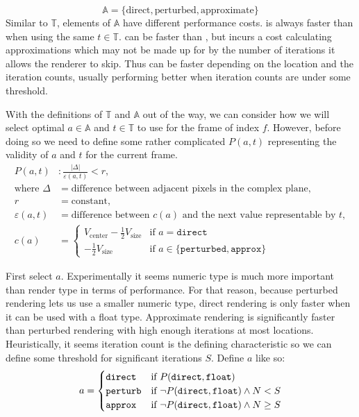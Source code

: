 \documentclass{article}
\begin{document}
\[
    \mathbb{A} = \{\text{direct},\text{perturbed},\text{approximate}\}
\]
Similar to $\mathbb{T}$, elements of $\mathbb{A}$ have different performance costs.  is always faster than  when using the same $t\in\mathbb{T}$.  can be faster than , but incurs a cost calculating approximations which may not be made up for by the number of iterations it allows the renderer to skip. Thus  can be faster depending on the location and the iteration counts, usually performing better when iteration counts are under some threshold.
\par With the definitions of $\mathbb{T}$ and $\mathbb{A}$ out of the way, we can consider how we will select optimal $a\in\mathbb{A}$ and $t\in\mathbb{T}$ to use for the frame of index $f$. However, before doing so we need to define some rather complicated $P(a,t)$ representing the validity of $a$ and $t$ for the current frame.
\[
\begin{aligned}
    P(a,t) &: \frac{|\Delta|}{\varepsilon(a,t)} < r, \\
    \text{where } \Delta &= \text{difference between adjacent pixels in the complex plane}, \\
    r &= \text{constant}, \\
    \varepsilon(a,t) &= \text{difference between } c(a) \text{ and the next value representable by } t, \\
    c(a) &= \begin{cases}
        V_\text{center} - \frac{1}{2}V_\text{size} & \text{if } a = \texttt{direct} \\
        -\frac{1}{2}V_\text{size} & \text{if } a \in \{\texttt{perturbed}, \texttt{approx}\}
    \end{cases}
\end{aligned}
\]
\par First select $a$. Experimentally it seems numeric type is much more important than render type in terms of performance. For that reason, because perturbed rendering lets us use a smaller numeric type, direct rendering is only faster when it can be used with a float type. Approximate rendering is significantly faster than perturbed rendering with high enough iterations at most locations. Heuristically, it seems iteration count is the defining characteristic so we can define some threshold for significant iterations $S$. Define $a$ like so:
\[
    a = \begin{cases}
        \verb|direct| & \text{if } P(\verb|direct|, \verb|float|) \\
        \verb|perturb| & \text{if }  \lnot P(\verb|direct|, \verb|float|) \land N<S\\
        \verb|approx| & \text{if } \lnot P(\verb|direct|, \verb|float|) \land N \geq S \\
    \end{cases}
\]
\end{document}
